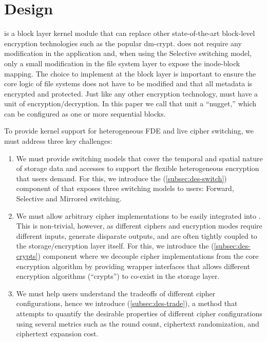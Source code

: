 \section{\sys Design}\label{sec:des}

\sys is a block layer kernel module that can replace other state-of-the-art
block-level encryption technologies such as the popular dm-crypt. \sys does not
require any modification in the application and, when using the Selective
switching model, only a small modification in the file system layer to expose
the inode-block mapping. The choice to implement \sys at the block layer is
important to ensure the core logic of file systems does not have to be modified
and that all metadata is encrypted and protected. Just like any other encryption
technology, \sys must have a unit of encryption/decryption. In this paper we
call that unit a ``nugget,'' which can be configured as one or more sequential
blocks.

To provide kernel support for heterogeneous FDE and live cipher switching, we
must address three key challenges:

\begin{enumerate}

\item We must provide switching models that cover the temporal and spatial
  nature of storage data and accesses to support the flexible heterogeneous
  encryption that users demand. For this, we introduce the \sysA
  (\cref{subsec:des-switch}) component of \sys that exposes three switching
  models to users: Forward, Selective and Mirrored switching.

\item We must allow arbitrary cipher implementations to be easily integrated
  into \sys. This is non-trivial, however, as different ciphers and encryption
  modes require different inputs, generate disparate outputs, and are often
  tightly coupled to the storage/encryption layer itself. For this, we introduce
  the \sysB (\cref{subsec:des-crypts}) component where we decouple cipher
  implementations from the core encryption algorithm by providing wrapper
  interfaces that allows different encryption algorithms (``crypts'') to
  co-exist in the storage layer.

\item We must help users understand the tradeoffs of different cipher
  configurations, hence we introduce \sysC (\cref{subsec:des-trade}), a method
  that attempts to quantify the desirable properties of different cipher
  configurations using several metrics such as the round count, ciphertext
  randomization, and ciphertext expansion cost.

\end{enumerate}

